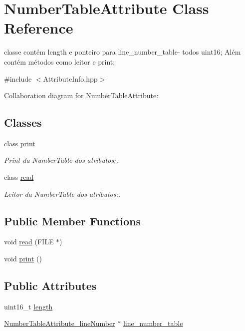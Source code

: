 \hypertarget{class_number_table_attribute}{}\section{Number\+Table\+Attribute Class Reference}
\label{class_number_table_attribute}


classe contém length e ponteiro para line\+\_\+number\+\_\+table-\/ todos uint16; Além contém métodos como leitor e print;  




{\ttfamily \#include $<$Attribute\+Info.\+hpp$>$}



Collaboration diagram for Number\+Table\+Attribute\+:
\subsection*{Classes}
\begin{DoxyCompactItemize}
\item 
class \hyperlink{class_number_table_attribute_1_1print}{print}
\begin{DoxyCompactList}\small\item\em Print da Number\+Table dos atributos;. \end{DoxyCompactList}\item 
class \hyperlink{class_number_table_attribute_1_1read}{read}
\begin{DoxyCompactList}\small\item\em Leitor da Number\+Table dos atributos;. \end{DoxyCompactList}\end{DoxyCompactItemize}
\subsection*{Public Member Functions}
\begin{DoxyCompactItemize}
\item 
void \hyperlink{class_number_table_attribute_aa56c8bbf97ea1c478e4488b93f1287a7}{read} (F\+I\+LE $\ast$)
\item 
void \hyperlink{class_number_table_attribute_a43d3c624a043ea9140c69162e3f82eaa}{print} ()
\end{DoxyCompactItemize}
\subsection*{Public Attributes}
\begin{DoxyCompactItemize}
\item 
uint16\+\_\+t \hyperlink{class_number_table_attribute_a5870a64b7a84529045ab1a659811f859}{length}
\item 
\hyperlink{class_number_table_attribute__line_number}{Number\+Table\+Attribute\+\_\+line\+Number} $\ast$ \hyperlink{class_number_table_attribute_ab5e3c231f1507f7be6158422eb71aeeb}{line\+\_\+number\+\_\+table}
\end{DoxyCompactItemize}


